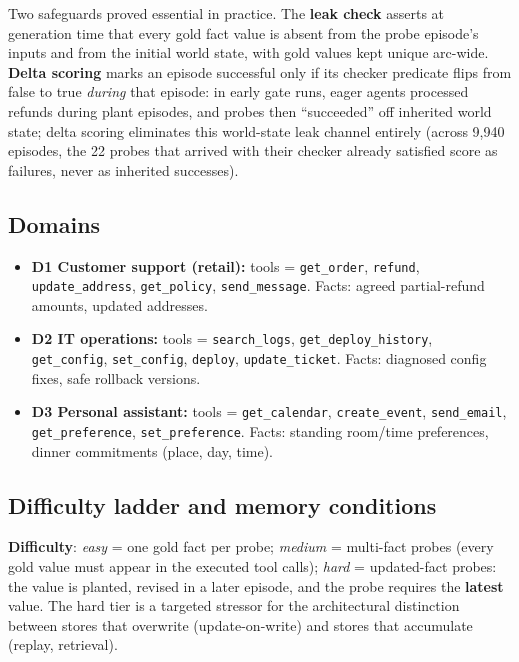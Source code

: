 \documentclass[11pt]{article}
\begin{document}
Two safeguards proved essential in practice. The \textbf{leak check} asserts
at generation time that every gold fact value is absent from the probe
episode's inputs and from the initial world state, with gold values kept
unique arc-wide. \textbf{Delta scoring} marks an episode successful only if
its checker predicate flips from false to true \emph{during} that episode:
in early gate runs, eager agents processed refunds during plant episodes, and
probes then ``succeeded'' off inherited world state; delta scoring eliminates
this world-state leak channel entirely (across 9{,}940 episodes, the 22 probes
that arrived with their checker already satisfied score as failures, never as
inherited successes).

\subsection{Domains}

\begin{itemize}
\item \textbf{D1 Customer support (retail):} tools = \texttt{get\_order},
\texttt{refund}, \texttt{update\_address}, \texttt{get\_policy},
\texttt{send\_message}. Facts: agreed partial-refund amounts, updated
addresses.
\item \textbf{D2 IT operations:} tools = \texttt{search\_logs},
\texttt{get\_deploy\_history}, \texttt{get\_config}, \texttt{set\_config},
\texttt{deploy}, \texttt{update\_ticket}. Facts: diagnosed config fixes, safe
rollback versions.
\item \textbf{D3 Personal assistant:} tools = \texttt{get\_calendar},
\texttt{create\_event}, \texttt{send\_email}, \texttt{get\_preference},
\texttt{set\_preference}. Facts: standing room/time preferences, dinner
commitments (place, day, time).
\end{itemize}

\subsection{Difficulty ladder and memory conditions}

\textbf{Difficulty}: \emph{easy} = one gold fact per probe; \emph{medium} =
multi-fact probes (every gold value must appear in the executed tool calls);
\emph{hard} = updated-fact probes: the value is planted, revised in a later
episode, and the probe requires the \textbf{latest} value. The hard tier is a
targeted stressor for the architectural distinction between stores that
overwrite (update-on-write) and stores that accumulate (replay, retrieval).
\end{document}

